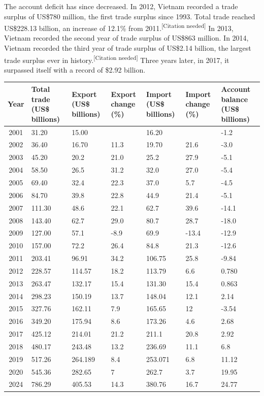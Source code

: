 \documentclass{article}
\begin{document}
The account deficit has since decreased. In 2012, Vietnam recorded a trade surplus of US\$780 million, the first trade surplus since 1993. Total trade reached US\$228.13 billion, an increase of 12.1\% from 2011.\textsuperscript{[Citation needed]} In 2013, Vietnam recorded the second year of trade surplus of US\$863 million. In 2014, Vietnam recorded the third year of trade surplus of US\$2.14 billion, the largest trade surplus ever in history.\textsuperscript{[Citation needed]} Three years later, in 2017, it surpassed itself with a record of \$2.92 billion.
\begin{table}[htbp]
\centering
\label{tab:TradeData_Fixed}
\small 

\begin{tabular}{| c | p{1cm} | p{1.25cm} | p{1.65cm} | p{1.5cm} | p{1.25cm} | p{1.25cm} |}
\toprule
\textbf{Year} & \textbf{T\-o\-t\-a\-l t\-r\-a\-d\-e (U\-S\$ b\-i\-l\-l\-i\-o\-n\-s)} & \textbf{Export (US\$ billions)} & \textbf{Export change (\%)} & \textbf{Import (US\$ billions)} & \textbf{Import change (\%)} & \textbf{Account balance (US\$ billions)} \\
\midrule
2001 & 31.20 & 15.00 & & 16.20 & & -1.2 \\
2002 & 36.40 & 16.70 & 11.3 & 19.70 & 21.6 & -3.0 \\
2003 & 45.20 & 20.2 & 21.0 & 25.2 & 27.9 & -5.1 \\
2004 & 58.50 & 26.5 & 31.2 & 32.0 & 27.0 & -5.4 \\
2005 & 69.40 & 32.4 & 22.3 & 37.0 & 5.7 & -4.5 \\
2006 & 84.70 & 39.8 & 22.8 & 44.9 & 21.4 & -5.1 \\
2007 & 111.30 & 48.6 & 22.1 & 62.7 & 39.6 & -14.1 \\
2008 & 143.40 & 62.7 & 29.0 & 80.7 & 28.7 & -18.0 \\
2009 & 127.00 & 57.1 & -8.9 & 69.9 & -13.4 & -12.9 \\
2010 & 157.00 & 72.2 & 26.4 & 84.8 & 21.3 & -12.6 \\
2011 & 203.41 & 96.91 & 34.2 & 106.75 & 25.8 & -9.84\\
2012 & 228.57 & 114.57 & 18.2 & 113.79 & 6.6 & 0.780\\
2013 & 263.47 & 132.17 & 15.4 & 131.30 & 15.4 & 0.863 \\
2014 & 298.23 & 150.19 & 13.7 & 148.04 & 12.1 & 2.14 \\
2015 & 327.76 & 162.11 & 7.9 & 165.65 & 12 & -3.54 \\
2016 & 349.20 & 175.94 & 8.6 & 173.26 & 4.6 & 2.68 \\
2017 & 425.12 & 214.01 & 21.2 & 211.1 & 20.8 & 2.92 \\
2018 & 480.17 & 243.48 & 13.2 & 236.69 & 11.1 & 6.8 \\
2019 & 517.26 & 264.189 & 8.4 & 253.071 & 6.8 & 11.12\\
2020 & 545.36 & 282.65 & 7 & 262.7 & 3.7 & 19.95 \\
2024 & 786.29 & 405.53 & 14.3 & 380.76 & 16.7 & 24.77 \\
\bottomrule
\end{tabular}
\end{table}
\end{document}
